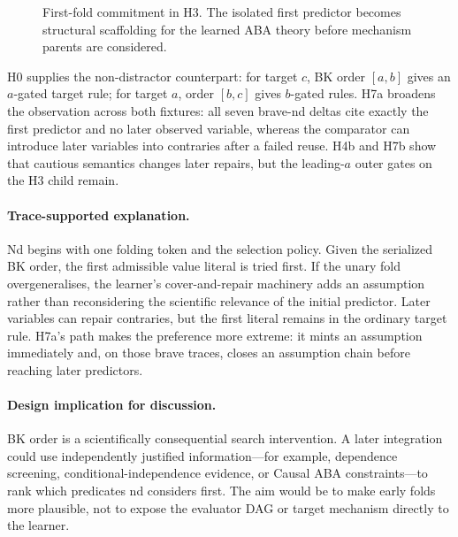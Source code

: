 \documentclass[11pt]{article}
\DeclareRobustCommand{\code}[1]{\texttt{\detokenize{#1}}}
\newcommand{\explanation}{\paragraph{Trace-supported explanation.}}
\newcommand{\implication}{\paragraph{Design implication for discussion.}}
\begin{document}
\begin{figure}[ht]
\centering
{}
\caption{First-fold commitment in H3. The isolated first predictor becomes
structural scaffolding for the learned ABA theory before mechanism parents are
considered.}
\label{fig:first-bk}
\end{figure}

H0 supplies the non-distractor counterpart: for target \(c\), BK order
\([a,b]\) gives an \(a\)-gated target rule; for target \(a\), order \([b,c]\)
gives \(b\)-gated rules. H7a broadens the observation across both fixtures:
all seven brave-nd \code{sechk} deltas cite exactly the first predictor and no
later observed variable, whereas the \code{relto} comparator can introduce
later variables into contraries after a failed reuse. H4b and H7b show that
cautious semantics changes later repairs, but the leading-\(a\) outer gates on
the H3 child remain.

\explanation
Nd begins with one folding token and the \code{any} selection policy. Given the
serialized BK order, the first admissible value literal is tried first. If the
unary fold overgeneralises, the learner's cover-and-repair machinery adds an
assumption rather than reconsidering the scientific relevance of the initial
predictor. Later variables can repair contraries, but the first literal remains
in the ordinary target rule. H7a's \code{sechk} path makes the preference more
extreme: it mints an assumption immediately and, on those brave traces, closes
an assumption chain before reaching later predictors.

\implication
BK order is a scientifically consequential search intervention. A later
integration could use independently justified information---for example,
dependence screening, conditional-independence evidence, or Causal ABA
constraints---to rank which predicates nd considers first. The aim would be
to make early folds more plausible, not to expose the evaluator DAG or target
mechanism directly to the learner.
\end{document}

